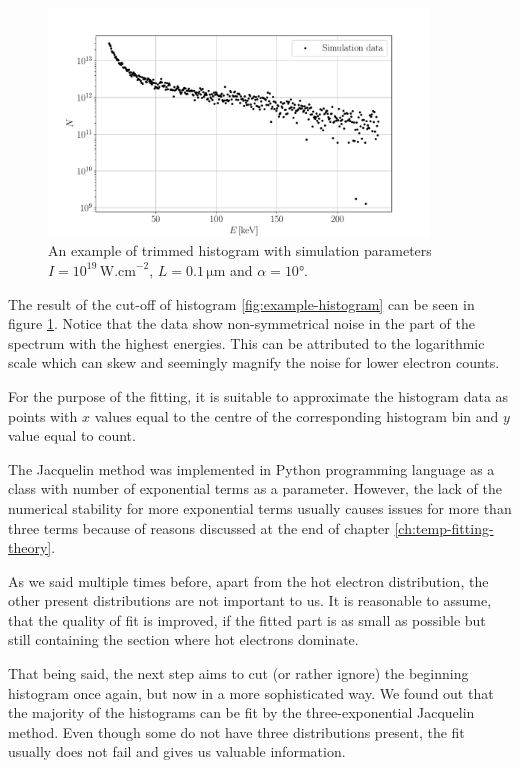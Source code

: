 \begin{figure}[h]
	\centering
	\includegraphics[width=0.9\textwidth]{figures/trimmed-hist}
	\caption{An example of trimmed histogram with simulation parameters $I=10^{19}\,\mathrm{W.cm}^{-2}$, $L=0.1\,\mathrm{\mu m}$ and $\alpha = 10$°.}
	\label{fig:trimmed-hist}
\end{figure}

The result of the cut-off of histogram \ref{fig:example-histogram} can be seen in figure \ref{fig:trimmed-hist}. Notice that the data show non-symmetrical noise in the part of the spectrum with the highest energies. This can be attributed to the logarithmic scale which can skew and seemingly magnify the noise for lower electron counts. 

For the purpose of the fitting, it is suitable to approximate the histogram data as points with $x$ values equal to the centre of the corresponding histogram bin and $y$ value equal to count.

The Jacquelin method was implemented in Python programming language as a class with number of exponential terms as a parameter. However, the lack of the numerical stability for more exponential terms usually causes issues for more than three terms because of reasons discussed at the end of chapter \ref{ch:temp-fitting-theory}.

As we said multiple times before, apart from the hot electron distribution, the other present distributions are not important to us. It is reasonable to assume, that the quality of fit is improved, if the fitted part is as small as possible but still containing the section where hot electrons dominate.

That being said, the next step aims to cut (or rather ignore) the beginning histogram once again, but now in a more sophisticated way. We found out that the majority of the histograms can be fit by the three-exponential Jacquelin method. Even though some do not have three distributions present, the fit usually does not fail and gives us valuable information.


